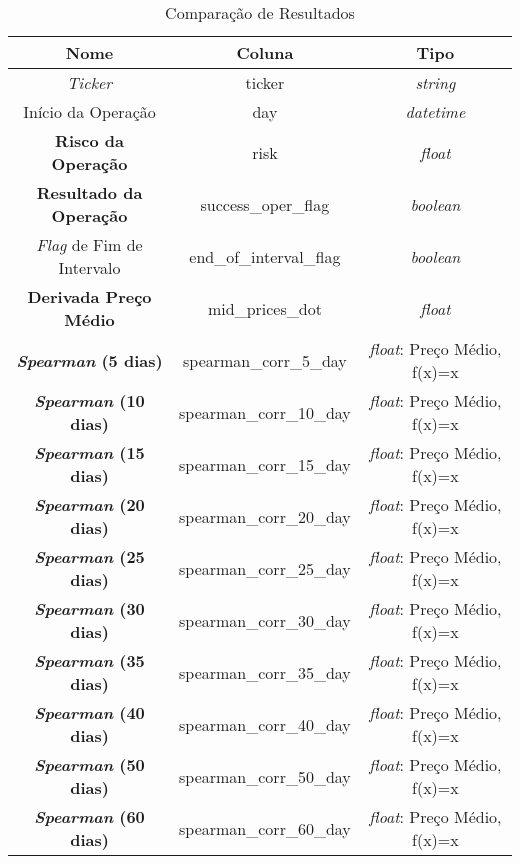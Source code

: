 \begin{table}[h!]
    \begin{center}
        \begin{tabular}{ c|c|c }
            Nome & Coluna & Tipo \\
            \hline
            \textit{Ticker} & ticker & \textit{string} \\
            Início da Operação & day & \textit{datetime} \\
            \textbf{Risco da Operação} & risk & \textit{float} \\
            \textbf{Resultado da Operação} & success\_oper\_flag & \textit{boolean} \\
            \textit{Flag} de Fim de Intervalo & end\_of\_interval\_flag & \textit{boolean} \\
            \textbf{Derivada Preço Médio} & mid\_prices\_dot & \textit{float} \\
            \textbf{\textit{Spearman} (5 dias)} & spearman\_corr\_5\_day & \textit{float}: Preço Médio, f(x)=x \\
            \textbf{\textit{Spearman} (10 dias)} & spearman\_corr\_10\_day & \textit{float}: Preço Médio, f(x)=x \\
            \textbf{\textit{Spearman} (15 dias)} & spearman\_corr\_15\_day & \textit{float}: Preço Médio, f(x)=x \\
            \textbf{\textit{Spearman} (20 dias)} & spearman\_corr\_20\_day & \textit{float}: Preço Médio, f(x)=x \\
            \textbf{\textit{Spearman} (25 dias)} & spearman\_corr\_25\_day & \textit{float}: Preço Médio, f(x)=x \\
            \textbf{\textit{Spearman} (30 dias)} & spearman\_corr\_30\_day & \textit{float}: Preço Médio, f(x)=x \\
            \textbf{\textit{Spearman} (35 dias)} & spearman\_corr\_35\_day & \textit{float}: Preço Médio, f(x)=x \\
            \textbf{\textit{Spearman} (40 dias)} & spearman\_corr\_40\_day & \textit{float}: Preço Médio, f(x)=x \\
            \textbf{\textit{Spearman} (50 dias)} & spearman\_corr\_50\_day & \textit{float}: Preço Médio, f(x)=x \\
            \textbf{\textit{Spearman} (60 dias)} & spearman\_corr\_60\_day & \textit{float}: Preço Médio, f(x)=x \\
        \end{tabular}
        \caption{Comparação de Resultados}
        \label{tab:7}
    \end{center}
\end{table}

